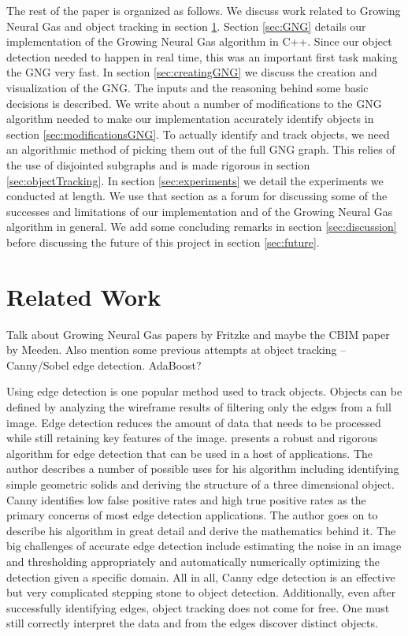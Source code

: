 \documentclass{article}
\renewcommand{\|}{\origbar} %
\begin{document}
The rest of the paper is organized as follows. We discuss work related to Growing Neural Gas and object tracking in section \ref{sec:relatedWork}. Section \ref{sec:GNG} details our implementation of the Growing Neural Gas algorithm in C++. Since our object detection needed to happen in real time, this was an important first task making the GNG very fast. In section \ref{sec:creatingGNG} we discuss the creation and visualization of the GNG. The inputs and the reasoning behind some basic decisions is described. We write about a number of modifications to the GNG algorithm needed to make our implementation accurately identify objects in section \ref{sec:modificationsGNG}. To actually identify and track objects, we need an algorithmic method of picking them out of the full GNG graph. This relies of the use of disjointed subgraphs and is made rigorous in section \ref{sec:objectTracking}. In section \ref{sec:experiments} we detail the experiments we conducted at length. We use that section as a forum for discussing some of the successes and limitations of our implementation and of the Growing Neural Gas algorithm in general. We add some concluding remarks in section \ref{sec:discussion} before discussing the future of this project in section \ref{sec:future}.

\section{Related Work}
\label{sec:relatedWork}

Talk about Growing Neural Gas papers by Fritzke and maybe the CBIM paper by Meeden. Also mention some previous attempts at object tracking -- Canny/Sobel edge detection. AdaBoost?

Using edge detection is one popular method used to track objects. Objects can be defined by analyzing the wireframe results of filtering only the edges from a full image. Edge detection reduces the amount of data that needs to be processed while still retaining key features of the image.  presents a robust and rigorous algorithm for edge detection that can be used in a host of applications. The author describes a number of possible uses for his algorithm including identifying simple geometric solids and deriving the structure of a three dimensional object. Canny identifies low false positive rates and high true positive rates as the primary concerns of most edge detection applications. The author goes on to describe his algorithm in great detail and derive the mathematics behind it. The big challenges of accurate edge detection include estimating the noise in an image and thresholding appropriately and automatically numerically optimizing the detection given a specific domain. All in all, Canny edge detection is an effective but very complicated stepping stone to object detection. Additionally, even after successfully identifying edges, object tracking does not come for free. One must still correctly interpret the data and from the edges discover distinct objects.
\end{document}
